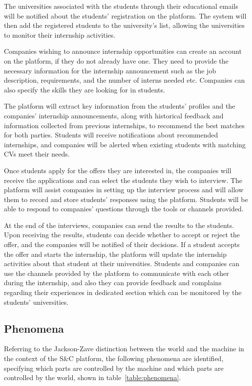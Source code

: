 The universities associated with the students through their educational emails will be notified about the students' registration on the platform. 
The system will then add the registered students to the university’s list, allowing the universities to monitor their internship activities.

Companies wishing to announce internship opportunities can create an account on the platform, if they do not already have one. They need to
provide the necessary information for the internship announcement such as the job description, requirements, and the number of interns needed etc. 
Companies can also specify the skills they are looking for in students.

The platform will extract key information from the students' profiles and the companies' internship announcements, along with historical feedback and 
information collected from previous internships, to recommend the best matches for both parties. Students will receive notifications about 
recommended internships, and companies will be alerted when existing students with matching CVs meet their needs.

Once students apply for the offers they are interested in, the companies will receive the applications and can select the students they wish 
to interview. The platform will assist companies in setting up the interview process and will allow them to record and store students' responses 
using the platform. Students will be able to respond to companies' questions through the tools or channels provided.

At the end of the interviews, companies can send the results to the students. Upon receiving the results, students can decide whether to accept 
or reject the offer, and the companies will be notified of their decisions. If a student accepts the offer and starts the internship, the platform 
will update the internship activities about that student at their universities. Students and companies can use the channels provided by the platform to
communicate with each other during the internship, and also they can provide feedback and complains regarding their experiences in dedicated section
which can be monitored by the students' universities. 

\subsection{Phenomena}
Referring to the Jackson-Zave distinction between the world and the machine in the context of the S\&C platform, the following phenomena are 
identified, specifying which parts are controlled by the machine and which parts are controlled by the world, shown in table~\ref{table:phenomena}.

